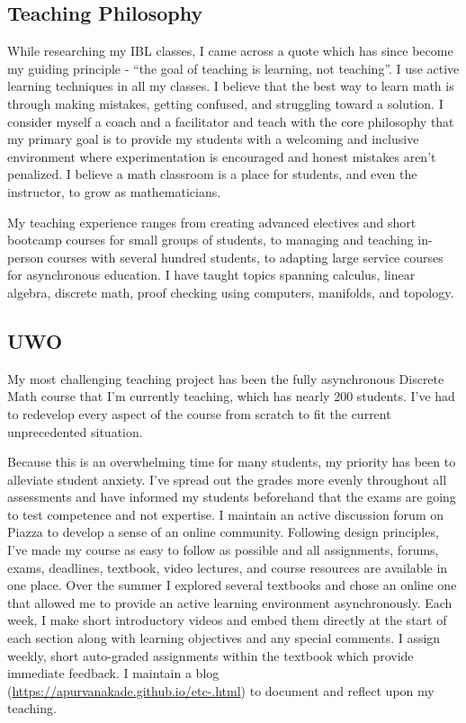 \subsection*{Teaching Philosophy}
  While researching my IBL classes, I came across a quote which has since become my guiding principle - ``the goal of teaching is learning, not teaching''.
  I use active learning techniques in all my classes. I believe that the best way to learn math is through making mistakes, getting confused, and struggling toward a solution. I consider myself a coach and a facilitator and teach with the core philosophy that my primary goal is to provide my students with a welcoming and inclusive environment where experimentation is encouraged and honest mistakes aren't penalized. I believe a math classroom is a place for students, and even the instructor, to grow as mathematicians.

  My teaching experience ranges from creating advanced electives and short bootcamp courses for small groups of students, to managing and teaching in-person courses with several hundred students, to adapting large service courses for asynchronous education.  I have taught topics spanning calculus, linear algebra, discrete math, proof checking using computers, manifolds, and topology.

\subsection*{UWO}
  My most challenging teaching project has been the fully asynchronous Discrete Math course that I'm currently teaching, which has nearly 200 students. 
  I've had to redevelop every aspect of the course from scratch to fit the current unprecedented situation.

  Because this is an overwhelming time for many students, my priority has been to alleviate student anxiety. 
  I've spread out the grades more evenly throughout all assessments and have informed my students beforehand that the exams are going to test competence and not expertise.
  I maintain an active discussion forum on Piazza to develop a sense of an online community.
  Following design principles, I've made my course as easy to follow as possible and all assignments, forums, exams, deadlines, textbook, video lectures, and course resources are available in one place.
  Over the summer I explored several textbooks and chose an online one that allowed me to provide an active learning environment asynchronously.
  Each week, I make short introductory videos and embed them directly at the start of each section along with learning objectives and any special comments.
  I assign weekly, short auto-graded assignments within the textbook which provide immediate feedback.
  I maintain a blog (\url{https://apurvanakade.github.io/etc-.html}) to document and reflect upon my teaching.

